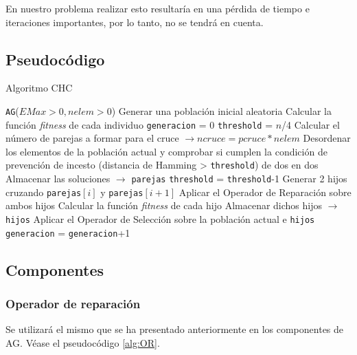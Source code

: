 En nuestro problema realizar esto resultaría en una pérdida de tiempo e iteraciones importantes, por lo tanto, no se tendrá en cuenta. 

\subsection{Pseudocódigo}

\begin{algorithm}[h]
\caption{Algoritmo CHC}\label{alg:CHC}
\begin{algorithmic}[1]
\Procedure \texttt{AG}($EMax > 0, nelem > 0$)
\State Generar una población inicial aleatoria
\State Calcular la función \textit{fitness} de cada individuo
\State \texttt{generacion} = 0
\State \texttt{threshold} = $n$/4
	\State Calcular el número de parejas a formar para el cruce $\xrightarrow{}{} ncruce = pcruce*nelem$
	\State Desordenar los elementos de la población actual y comprobar si cumplen la condición de prevención de incesto (distancia de Hamming > \texttt{threshold}) de dos en dos
		\State Almacenar las soluciones $\xrightarrow{}{}$ \texttt{parejas}
	\EndIf
			\State \texttt{threshold} = \texttt{threshold}-1
		\EndIf
	\Else
			\State Generar 2 hijos cruzando \texttt{parejas}$[i]$ y \texttt{parejas}$[i+1]$
			\State Aplicar el Operador de Reparación sobre ambos hijos
			\State Calcular la función \textit{fitness} de cada hijo
			\State Almacenar dichos hijos $\xrightarrow{}{}$ \texttt{hijos}
		\EndFor
		\State Aplicar el Operador de Selección sobre la población actual e \texttt{hijos}
	\EndIf
	\State \texttt{generacion} = \texttt{generacion}+1
\EndWhile
\EndProcedure
\end{algorithmic}
\end{algorithm}

\subsection{Componentes}
\subsubsection{Operador de reparación}
Se utilizará el mismo que se ha presentado anteriormente en los componentes de AG. 
Véase el pseudocódigo \ref{alg:OR}.

